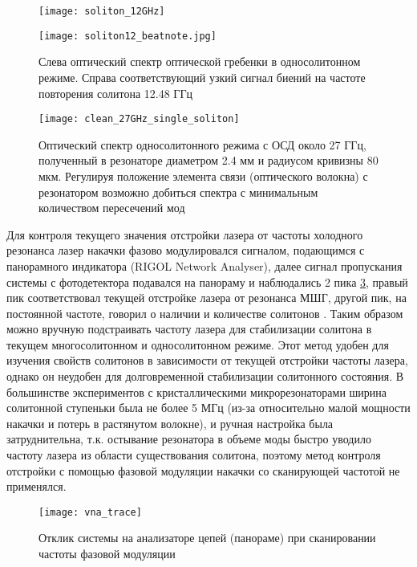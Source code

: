 \begin{figure}[ht]
  \begin{minipage}[ht]{0.49\linewidth}\centering
    \texttt{[image: soliton\_12GHz]}
  \end{minipage}
  \hfill
  \begin{minipage}[ht]{0.49\linewidth}\centering
    \texttt{[image: soliton12\_beatnote.jpg]}
  \end{minipage}
  \caption{Слева оптический спектр оптической гребенки в односолитонном режиме. Справа соответствующий узкий сигнал биений на частоте повторения солитона 12.48 ГГц}
  \label{soliton_12GHz}
\end{figure}


\begin{figure}[ht]
\centering
  \texttt{[image: clean\_27GHz\_single\_soliton]}
  \caption{Оптический спектр односолитонного режима с ОСД около 27 ГГц, полученный в резонаторе диаметром 2.4 мм и радиусом кривизны 80 мкм. Регулируя положение элемента связи (оптического волокна) с резонатором возможно добиться спектра с минимальным количеством пересечений мод}
  \label{clean_27GHz_single_soliton}
\end{figure}

Для контроля текущего значения отстройки лазера от частоты холодного резонанса лазер накачки фазово модулировался сигналом, подающимся с панорамного индикатора (RIGOL Network Analyser), далее сигнал пропускания системы с фотодетектора подавался на панораму и наблюдались 2 пика \ref{vna_trace}, правый пик соответствовал текущей отстройке лазера от резонанса МШГ, другой пик, на постоянной частоте, говорил о наличии и количестве солитонов \cite{Karpov2017}. Таким образом можно вручную подстраивать частоту лазера для стабилизации солитона в текущем многосолитонном и односолитонном режиме. Этот метод удобен для изучения свойств солитонов в зависимости от текущей отстройки частоты лазера, однако он неудобен для долговременной стабилизации солитонного состояния. В большинстве экспериментов с кристаллическими микрорезонаторами ширина солитонной ступеньки была не более 5 МГц (из-за относительно малой мощности накачки и потерь в растянутом волокне), и ручная настройка была затруднительна, т.к. остывание резонатора в объеме моды быстро уводило частоту лазера из области существования солитона, поэтому метод контроля отстройки с помощью фазовой модуляции накачки со сканирующей частотой не применялся.

\begin{figure}[ht]
\centering
  \texttt{[image: vna\_trace]}
  \caption{Отклик системы на анализаторе цепей (панораме) при сканировании частоты фазовой модуляции }
  \label{vna_trace}
\end{figure}


